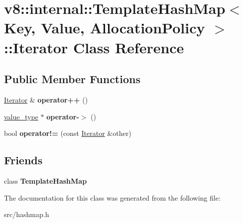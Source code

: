 \hypertarget{classv8_1_1internal_1_1_template_hash_map_1_1_iterator}{}\section{v8\+:\+:internal\+:\+:Template\+Hash\+Map$<$ Key, Value, Allocation\+Policy $>$\+:\+:Iterator Class Reference}
\label{classv8_1_1internal_1_1_template_hash_map_1_1_iterator}
\subsection*{Public Member Functions}
\begin{DoxyCompactItemize}
\item 
\hypertarget{classv8_1_1internal_1_1_template_hash_map_1_1_iterator_a2a2164cb6ae02f3431a2e55e28138850}{}\hyperlink{classv8_1_1internal_1_1_template_hash_map_1_1_iterator}{Iterator} \& {\bfseries operator++} ()\label{classv8_1_1internal_1_1_template_hash_map_1_1_iterator_a2a2164cb6ae02f3431a2e55e28138850}

\item 
\hypertarget{classv8_1_1internal_1_1_template_hash_map_1_1_iterator_a98831c55b13b54ec82660242e01773d4}{}\hyperlink{structv8_1_1internal_1_1_template_hash_map_1_1value__type}{value\+\_\+type} $\ast$ {\bfseries operator-\/$>$} ()\label{classv8_1_1internal_1_1_template_hash_map_1_1_iterator_a98831c55b13b54ec82660242e01773d4}

\item 
\hypertarget{classv8_1_1internal_1_1_template_hash_map_1_1_iterator_ade3b56449347905218dcfbc04324dc37}{}bool {\bfseries operator!=} (const \hyperlink{classv8_1_1internal_1_1_template_hash_map_1_1_iterator}{Iterator} \&other)\label{classv8_1_1internal_1_1_template_hash_map_1_1_iterator_ade3b56449347905218dcfbc04324dc37}

\end{DoxyCompactItemize}
\subsection*{Friends}
\begin{DoxyCompactItemize}
\item 
\hypertarget{classv8_1_1internal_1_1_template_hash_map_1_1_iterator_a832edaa667b9d84ea7de776a289ff79e}{}class {\bfseries Template\+Hash\+Map}\label{classv8_1_1internal_1_1_template_hash_map_1_1_iterator_a832edaa667b9d84ea7de776a289ff79e}

\end{DoxyCompactItemize}


The documentation for this class was generated from the following file\+:\begin{DoxyCompactItemize}
\item 
src/hashmap.\+h\end{DoxyCompactItemize}
